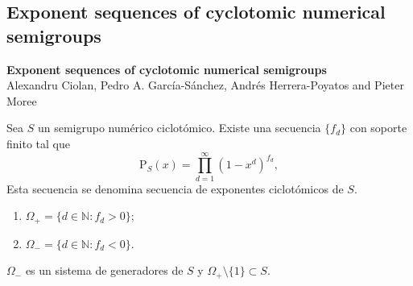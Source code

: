 \documentclass[10pt,compress]{beamer}
\begin{document}
\subsection{Exponent sequences of cyclotomic numerical semigroups}

\begin{frame}
  \begin{tcolorbox}[colback=ChetwodeBlue!10,colframe=ChetwodeBlue!60]
    \begin{center}
      \vspace*{-1mm} {\color{TurkishRose}\textbf{Exponent sequences of cyclotomic numerical semigroups}} \\
      Alexandru Ciolan, Pedro A. Garc\'ia-Sánchez, Andrés Herrera-Poyatos and Pieter Moree
    \end{center}
    \vspace*{-4mm}
  \end{tcolorbox}

  
  \begin{definition}
    Sea $S$ un semigrupo numérico ciclotómico. Existe una secuencia $\{f_d\}$ con soporte finito tal
    que \vspace*{-3mm}
    \[ \mathrm{P}_S(x) = \prod_{d = 1}^{\infty} (1 - x^d)^{f_d}, \] Esta secuencia se denomina
    secuencia de exponentes ciclotómicos de $S$.
    
    \begin{enumerate}
    \item $\Omega_+ = \{d \in \mathbb{N}: f_d > 0\}$;
    \item $\Omega_- = \{d \in \mathbb{N}: f_d < 0\}$.
    \end{enumerate}
  \end{definition}

  \begin{theorem}
    $\Omega_-$ es un sistema de generadores de $S$ y $\Omega_+ \setminus \{1\} \subset S$.
  \end{theorem}
\end{frame}
\end{document}
